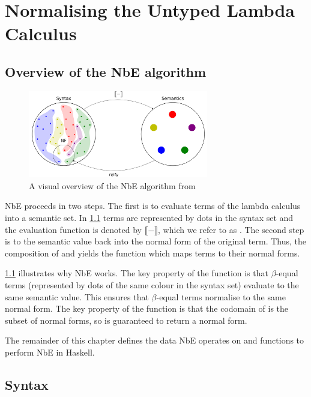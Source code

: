 \chapter{Normalising the Untyped Lambda Calculus}
\label{chap:untypednbe}

\section{Overview of the NbE algorithm}

\begin{figure}[h]
    \centering
    \includegraphics[width=0.7\textwidth]{./images/nbe_diagram}
    \caption{A visual overview of the NbE algorithm from \cite{slides}}
    \label{fig:nbeOverview}
\end{figure}

NbE proceeds in two steps. The first is to evaluate terms of the lambda calculus into a semantic set. In \ref{fig:nbeOverview} terms are represented by dots in the syntax set and the evaluation function is denoted by $\llbracket - \rrbracket$, which we refer to as . The second step is to  the semantic value back into the normal form of the original term. Thus, the composition of  and  yields the  function which maps terms to their normal forms. 

\ref{fig:nbeOverview} illustrates why NbE works. The key property of the  function is that $\beta$-equal terms (represented by dots of the same colour in the syntax set) evaluate to the same semantic value. This ensures that $\beta$-equal terms normalise to the same normal form. The key property of the  function is that the codomain of  is the subset of normal forms, so  is guaranteed to return a normal form. 

The remainder of this chapter defines the data NbE operates on and functions to perform NbE in Haskell.

\section{Syntax}

